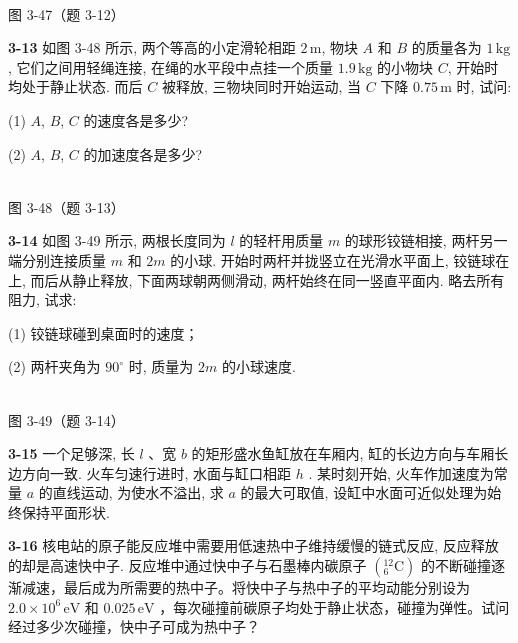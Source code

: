 \begin{center}
\resizebox{0.36\textwidth}{!}{}\\[4pt]
{\small 图 3-47（题 3-12）}
\end{center}

\newpage

\textbf{3-13} 如图 3-48 所示, 两个等高的小定滑轮相距 $2\,\mathrm{m}$, 物块 $A$ 和 $B$ 的质量各为 $1\,\mathrm{kg}$, 它们之间用轻绳连接, 在绳的水平段中点挂一个质量 $1.9\,\mathrm{kg}$ 的小物块 $C$, 开始时均处于静止状态. 而后 $C$ 被释放, 三物块同时开始运动, 当 $C$ 下降 $0.75\,\mathrm{m}$ 时, 试问:

(1) $A$, $B$, $C$ 的速度各是多少?

(2) $A$, $B$, $C$ 的加速度各是多少?

\begin{center}
\resizebox{0.50\textwidth}{!}{}\\[4pt]
{\small 图 3-48（题 3-13）}
\end{center}

\newpage

\textbf{3-14} 如图 3-49 所示, 两根长度同为 $l$ 的轻杆用质量 $m$ 的球形铰链相接, 两杆另一端分别连接质量 $m$ 和 $2m$ 的小球. 开始时两杆并拢竖立在光滑水平面上, 铰链球在上, 而后从静止释放, 下面两球朝两侧滑动, 两杆始终在同一竖直平面内. 略去所有阻力, 试求:

(1) 铰链球碰到桌面时的速度；

(2) 两杆夹角为 $90^{\circ}$ 时, 质量为 $2m$ 的小球速度.

\begin{center}
\resizebox{0.47\textwidth}{!}{}\\[4pt]
{\small 图 3-49（题 3-14）}
\end{center}

\newpage

\textbf{3-15} 一个足够深, 长 $l$ 、宽 $b$ 的矩形盛水鱼缸放在车厢内, 缸的长边方向与车厢长边方向一致. 火车匀速行进时, 水面与缸口相距 $h$ . 某时刻开始, 火车作加速度为常量 $a$ 的直线运动, 为使水不溢出, 求 $a$ 的最大可取值, 设缸中水面可近似处理为始终保持平面形状.

\newpage

\textbf{3-16} 核电站的原子能反应堆中需要用低速热中子维持缓慢的链式反应, 反应释放的却是高速快中子. 反应堆中通过快中子与石墨棒内碳原子 $\left(^{12}_{6}\mathrm{C}\right)$ 的不断碰撞逐渐减速，最后成为所需要的热中子。将快中子与热中子的平均动能分别设为 $2.0\times10^{6}\,\mathrm{eV}$ 和 $0.025\,\mathrm{eV}$ ，每次碰撞前碳原子均处于静止状态，碰撞为弹性。试问经过多少次碰撞，快中子可成为热中子？

